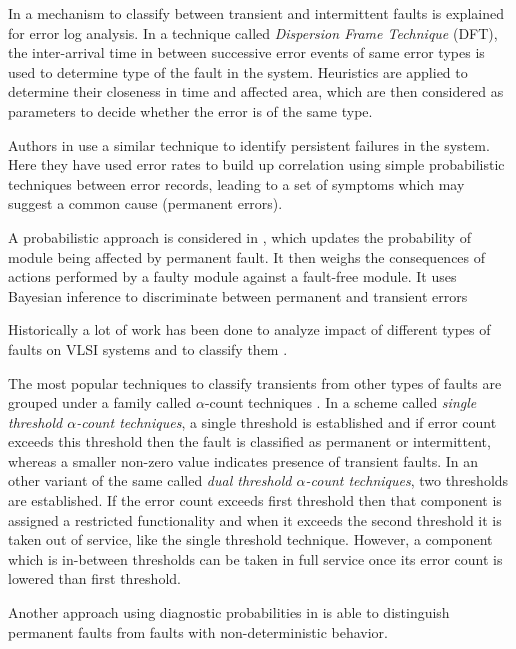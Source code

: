 In \cite{Lin1990} a mechanism to classify between transient and intermittent faults is explained for error log analysis. In a technique called \emph{Dispersion Frame Technique} (DFT), the inter-arrival time in between successive error events of same error types is used to determine type of the fault in the system. Heuristics are applied to determine their closeness in time and affected area, which are then considered as parameters to decide whether the error is of the same type.

Authors in \cite{Iyer1990} use a similar technique to identify persistent failures in the system. Here they have used error rates to build up correlation using simple probabilistic techniques between error records, leading to a set of symptoms which may suggest a common cause (permanent errors).

A probabilistic approach is considered in \cite{Pizza1998}, which updates the probability of module being affected by permanent fault. It then weighs the consequences of actions performed by a faulty module against a fault-free module. It uses Bayesian inference to discriminate between permanent and transient errors

Historically a lot of work has been done to analyze impact of different types of faults on VLSI systems \cite{Constantinescu2003,Constantinescu2007,Dodd2003} and to classify them \cite{Savir1980, Espinosa2013, Bondavalli2000, DeKleer2009}.

The most popular techniques to classify transients from other types of faults are grouped under a family called $\alpha$-count techniques \cite{Bondavalli2000}. In a scheme called \emph{single threshold $\alpha$-count techniques}, a single threshold is established and if error count exceeds this threshold then the fault is classified as permanent or intermittent, whereas a smaller non-zero value indicates presence of transient faults. In an other variant of the same called \emph{dual threshold $\alpha$-count techniques}, two thresholds are established. If the error count exceeds first threshold then that component is assigned a restricted functionality and when it exceeds the second threshold it is taken out of service, like the single threshold technique. However, a component which is in-between thresholds can be taken in full service once its error count is lowered than first threshold.

Another approach using diagnostic probabilities in \cite{DeKleer2009} is able to distinguish permanent faults from faults with non-deterministic behavior.

